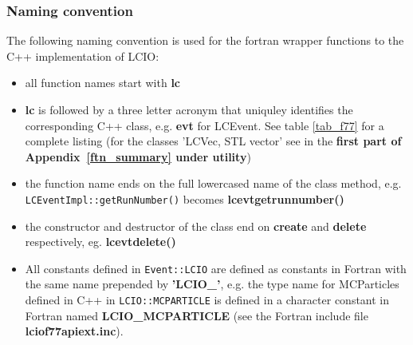 \subsubsection{Naming convention}
The following naming convention is used for the fortran wrapper functions to the 
C++ implementation of LCIO:
\begin{itemize}

\item{all function names start with {\bf lc}}

\item{{\bf lc} is followed by a three letter acronym that uniquley identifies the 
corresponding C++ class, e.g. {\bf evt} for LCEvent.} See table \ref{tab_f77} for a complete listing
(for the classes 'LCVec, STL vector' see in the {\bf first part of Appendix~\ref{ftn_summary} under utility})

\item{the function name ends on the full lowercased name of the class method, e.g. \\
 \verb$LCEventImpl::getRunNumber()$ becomes  {\bf lcevtgetrunnumber() } }

\item{the constructor and destructor of the class  end on {\bf create} and {\bf delete} 
respectively, eg. {\bf lcevtdelete()} }

\item{All constants defined in \verb$Event::LCIO$ are defined as constants in Fortran with the 
same name prepended by {\bf 'LCIO\_'}, e.g. the type name for MCParticles defined in C++ in
\verb$LCIO::MCPARTICLE$ is defined in a character constant in Fortran named
{\bf LCIO\_MCPARTICLE} (see the Fortran include file {\bf lciof77apiext.inc}).}

\end{itemize}

